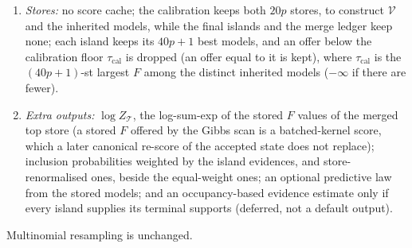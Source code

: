 \begin{enumerate}[leftmargin=2em,itemsep=1pt]
    sum is converted to a double, multiplied by $2^{-63}$ and divided by $4N$.
  \item \emph{Stores:} no score cache; the calibration keeps both $20p$ stores, to construct $\mathcal V$ and the inherited models, while
    the final islands and the merge ledger keep none; each island keeps its $40p+1$ best models, and an offer below the calibration
    floor $\tau_{\mathrm{cal}}$ is dropped (an offer equal to it is kept), where $\tau_{\mathrm{cal}}$ is the $(40p+1)$-st largest $F$
    among the distinct inherited models ($-\infty$ if there are fewer).
  \item \emph{Extra outputs:} $\log Z_{\mathcal T}$, the log-sum-exp of the stored $F$ values of the merged top store (a stored $F$ offered by
    the Gibbs scan is a batched-kernel score, which a later canonical re-score of the accepted state does not replace);
    inclusion probabilities weighted by the island evidences, and store-renormalised ones, beside the equal-weight ones; an optional
    predictive law from the stored models; and an occupancy-based evidence estimate only if every island supplies its terminal
    supports (deferred, not a default output).
\end{enumerate}
Multinomial resampling is unchanged.
